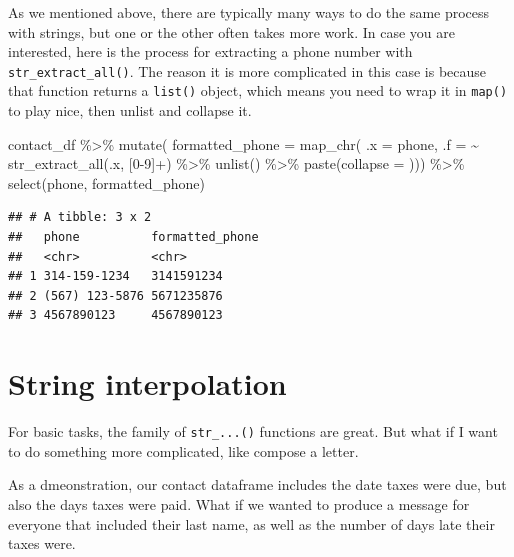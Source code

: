 \documentclass[
]{book}
\newenvironment{Shaded}{\begin{snugshade}}{\end{snugshade}}
\newcommand{\AttributeTok}[1]{\textcolor[rgb]{0.77,0.63,0.00}{#1}}
\newcommand{\FunctionTok}[1]{\textcolor[rgb]{0.00,0.00,0.00}{#1}}
\newcommand{\NormalTok}[1]{#1}
\newcommand{\SpecialCharTok}[1]{\textcolor[rgb]{0.00,0.00,0.00}{#1}}
\newcommand{\StringTok}[1]{\textcolor[rgb]{0.31,0.60,0.02}{#1}}
\begin{document}
As we mentioned above, there are typically many ways to do the same process with strings, but one or the other often takes more work. In case you are interested, here is the process for extracting a phone number with \texttt{str\_extract\_all()}. The reason it is more complicated in this case is because that function returns a \texttt{list()} object, which means you need to wrap it in \texttt{map()} to play nice, then unlist and collapse it.

\begin{Shaded}
\begin{Highlighting}[]
\NormalTok{contact\_df }\SpecialCharTok{\%\textgreater{}\%} 
  \FunctionTok{mutate}\NormalTok{(}
    \AttributeTok{formatted\_phone =} \FunctionTok{map\_chr}\NormalTok{(}
      \AttributeTok{.x =}\NormalTok{ phone, }
      \AttributeTok{.f =} \SpecialCharTok{\textasciitilde{}} \FunctionTok{str\_extract\_all}\NormalTok{(.x, }\StringTok{\textquotesingle{}[0{-}9]+\textquotesingle{}}\NormalTok{) }\SpecialCharTok{\%\textgreater{}\%} 
        \FunctionTok{unlist}\NormalTok{() }\SpecialCharTok{\%\textgreater{}\%} 
        \FunctionTok{paste}\NormalTok{(}\AttributeTok{collapse =} \StringTok{\textquotesingle{}\textquotesingle{}}\NormalTok{))) }\SpecialCharTok{\%\textgreater{}\%} 
  \FunctionTok{select}\NormalTok{(phone, formatted\_phone)}
\end{Highlighting}
\end{Shaded}

\begin{verbatim}
## # A tibble: 3 x 2
##   phone          formatted_phone
##   <chr>          <chr>          
## 1 314-159-1234   3141591234     
## 2 (567) 123-5876 5671235876     
## 3 4567890123     4567890123
\end{verbatim}

\hypertarget{string-interpolation}{%
\section{String interpolation}\label{string-interpolation}}

For basic tasks, the family of \texttt{str\_...()} functions are great. But what if I want to do something more complicated, like compose a letter.

As a dmeonstration, our contact dataframe includes the date taxes were due, but also the days taxes were paid. What if we wanted to produce a message for everyone that included their last name, as well as the number of days late their taxes were.
\end{document}
